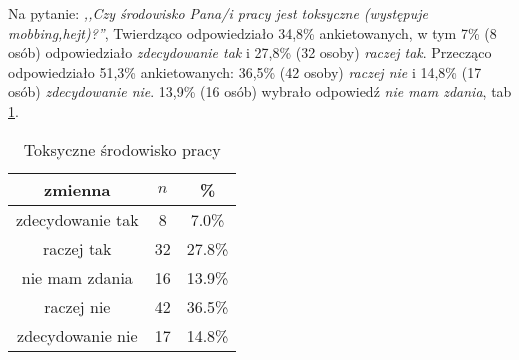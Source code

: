 
Na pytanie: \textit{,,Czy środowisko Pana/i pracy jest toksyczne (występuje mobbing,hejt)?''}, Twierdząco odpowiedziało 34,8\% ankietowanych, w tym 7\% (8 osób) odpowiedziało \textit{zdecydowanie tak} i 27,8\% (32 osoby) \textit{raczej tak}. Przecząco odpowiedziało 51,3\% ankietowanych: 36,5\% (42 osoby) \textit{raczej nie} i 14,8\% (17 osób) \textit{zdecydowanie nie}. 13,9\% (16 osób) wybrało odpowiedź \textit{nie mam zdania}, tab \ref{tab:Q8}.

\begin{table}[H]
\caption{Toksyczne środowisko pracy}
\centering
\begin{tabular}{ | c | c | c |}
\hline
zmienna & $n$ & \% \\
\hline
zdecydowanie tak  &  8  & 7.0\% \\
\hline
raczej tak  &  32  & 27.8\% \\
\hline
nie mam zdania  &  16  & 13.9\% \\
\hline
raczej nie  &  42  & 36.5\% \\
\hline
zdecydowanie nie  &  17  & 14.8\% \\
\hline
\end{tabular}
\label{tab:Q8}
\end{table}
